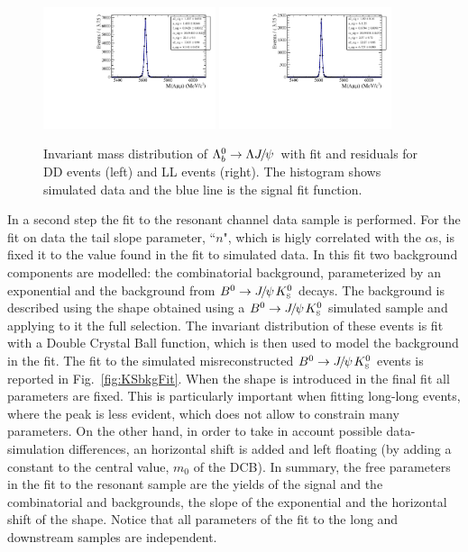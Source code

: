 \begin{figure}
\centering
\includegraphics[width=0.45\textwidth]{Lmumu/figs/MassFits/fitLb2JpsiL_DD_MC.pdf}
\includegraphics[width=0.45\textwidth]{Lmumu/figs/MassFits/fitLb2JpsiL_LL_MC.pdf}
\caption{Invariant mass distribution of $\Lb\ra\Lz\jpsi$ with fit and residuals for DD events (left) and LL events (right).
The histogram shows simulated data and the blue line is the signal fit function.}
\label{fig:Lb_jpsiMCfit}
\end{figure}

In a second step the fit to the resonant channel data sample is performed.
For the fit on data the tail slope parameter, ``$n$", which is higly correlated
with the $\alpha$s, is fixed it to the value found in the fit to simulated data.
In this fit two background components are modelled: the combinatorial background,
parameterized by an exponential and the background from $\Bz\ra\jpsi\KS$ decays.
The \KS background is described using the shape obtained using a $\Bz\ra\jpsi\KS$ simulated
sample and applying to it the full selection. The invariant distribution of these events
is fit with a Double Crystal Ball function, which is then used to model the \KS background
in the \Lb\to\jpsi\Lz fit. The fit to the simulated misreconstructed $\Bz\ra\jpsi\KS$ events
is reported in Fig.~\ref{fig:KSbkgFit}. When the \KS shape is introduced in the final fit all
parameters are fixed. This is particularly important when fitting long-long events, where the \KS
peak is less evident, which does not allow to constrain many parameters. On the other hand, in order
to take in account possible data-simulation differences, an horizontal shift is added and left
floating (by adding a constant to the central value, $m_0$ of the DCB).
In summary, the free parameters in the fit to the resonant \Lb\to\jpsi\Lz sample
are the yields of the signal and the combinatorial and \KS backgrounds, the slope
of the exponential and the horizontal shift of the \KS shape. Notice that all parameters
of the fit to the long and downstream samples are independent.


